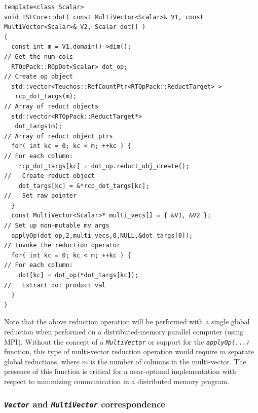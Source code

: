 {\scriptsize\begin{verbatim}
template<class Scalar>
void TSFCore::dot( const MultiVector<Scalar>& V1, const MultiVector<Scalar>& V2, Scalar dot[] )
{
  const int m = V1.domain()->dim();                                      // Get the num cols
  RTOpPack::ROpDot<Scalar> dot_op;                                       // Create op object
  std::vector<Teuchos::RefCountPtr<RTOpPack::ReductTarget> >
   rcp_dot_targs(m);                                                     // Array of reduct objects
  std::vector<RTOpPack::ReductTarget*>
   dot_targs(m);                                                         // Array of reduct object ptrs
  for( int kc = 0; kc < m; ++kc ) {                                      // For each column:
    rcp_dot_targs[kc] = dot_op.reduct_obj_create();                      //   Create reduct object
    dot_targs[kc] = &*rcp_dot_targs[kc];                                 //   Set raw pointer
  }
  const MultiVector<Scalar>* multi_vecs[] = { &V1, &V2 };                // Set up non-mutable mv args
  applyOp(dot_op,2,multi_vecs,0,NULL,&dot_targs[0]);                     // Invoke the reduction operator
  for( int kc = 0; kc < m; ++kc ) {                                      // For each column:
    dot[kc] = dot_op(*dot_targs[kc]);                                    //   Extract dot product val
  }
}
\end{verbatim}}

{}\noindent{}Note that the above reduction operation will be performed
with a single global reduction when performed on a distributed-memory
parallel computer (using MPI).  Without the concept of a
{}\texttt{\textit{Multi\-Vector}} or support for the
{}\texttt{\textit{applyOp(\-...)}} function, this type of multi-vector
reduction operation would require $m$ separate global reductions,
where $m$ is the number of columns in the multi-vector.  The presence
of this function is critical for a near-optimal implementation with
respect to minimizing communication in a distributed memory program.

%
\subsubsection{\texttt{\textit{Vector}} and {}\texttt{\textit{Multi\-Vector}} correspondence}
\label{tsfcore:sec:vector_vs_multivector}
%


